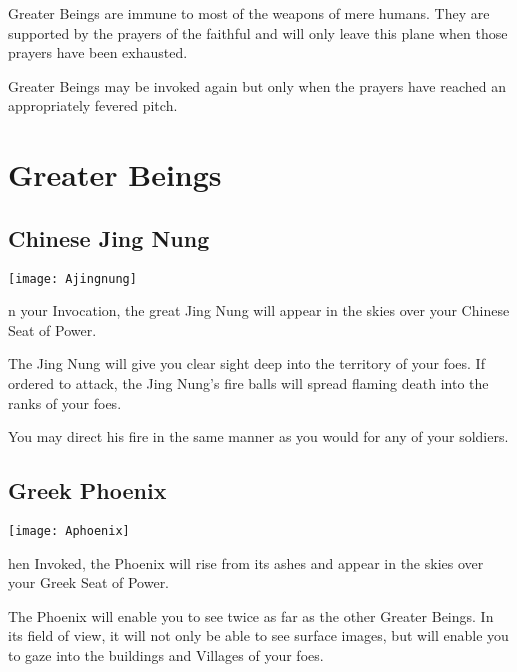 Greater Beings are immune to most of the weapons of mere humans. They are supported by the prayers of the faithful and will only leave this plane when those prayers have been exhausted.

Greater Beings may be invoked again but only when the prayers have reached an appropriately fevered pitch.

\section{Greater Beings}

\subsection{Chinese Jing Nung}


\begin{center}
    \texttt{[image: Ajingnung]}
\end{center}

n your Invocation, the great Jing Nung will appear in the skies over your Chinese Seat of Power.

The Jing Nung will give you clear sight deep into the territory of your foes. If ordered to attack, the Jing Nung’s fire balls will spread flaming death into the ranks of your foes.


You may direct his fire in the same manner as you would for any of your soldiers.

\subsection{Greek Phoenix}


\begin{center}
    \texttt{[image: Aphoenix]}
\end{center}


hen Invoked, the Phoenix will rise from its ashes and appear in the skies over your Greek Seat of Power.

The Phoenix will enable you to see twice as far as the other Greater Beings. In its field of view, it will not only be able to see surface images, but will enable you to gaze into the buildings and Villages of your foes.

